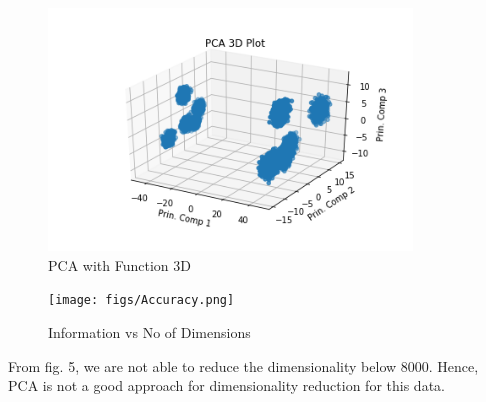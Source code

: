 \documentclass[journal,12pt,twocolumn]{IEEEtran}
\begin{document}
\begin{figure}[!h]
\begin{center}
\includegraphics[width=3.8in]{figs/PCA_3D.png}
\end{center}
\caption{PCA with Function 3D}
\label{fig: 3D Plot}
\end{figure}



\begin{figure}[!h]
\begin{center}
\texttt{[image: figs/Accuracy.png]}
\end{center}
\caption{Information vs No of Dimensions }
\label{fig: }
\end{figure}  

From fig. 5, we are not able to reduce the dimensionality below 8000. Hence, PCA is not a good approach for dimensionality reduction for this data.
\end{document}
